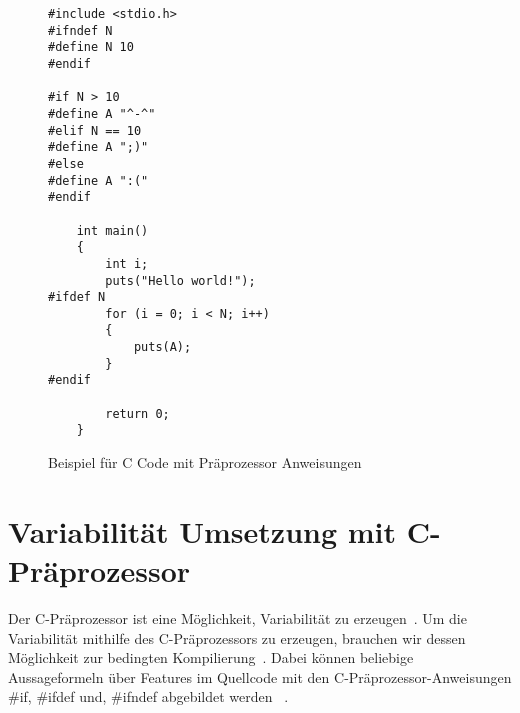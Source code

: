 \lstset{escapechar=@,style=customc}
\begin{figure}[H]
\hspace*{3cm}
\begin{minipage}{\textwidth}
\begin{lstlisting}
#include <stdio.h>
#ifndef N
#define N 10
#endif
	
#if N > 10
#define A "^-^"
#elif N == 10
#define A ";)"
#else
#define A ":("
#endif
	
	int main()
	{
		int i;
		puts("Hello world!");
#ifdef N
		for (i = 0; i < N; i++)
		{
			puts(A);
		}
#endif
		
		return 0;
	}
\end{lstlisting}
\end{minipage}
%
\caption{Beispiel für C Code mit Präprozessor Anweisungen}
\end{figure}


\section{Variabilität Umsetzung mit C-Präprozessor}
Der C-Präprozessor ist eine Möglichkeit, Variabilität zu erzeugen~\cite{ABKS13}. Um die Variabilität mithilfe des C-Präprozessors zu erzeugen, brauchen wir dessen Möglichkeit zur bedingten Kompilierung~\cite{ABKS13}. Dabei können beliebige Aussageformeln über Features im Quellcode mit den C-Präprozessor-Anweisungen \#if, \#ifdef und, \#ifndef abgebildet werden~\cite{BTS+:ESECFSE22} .\\















